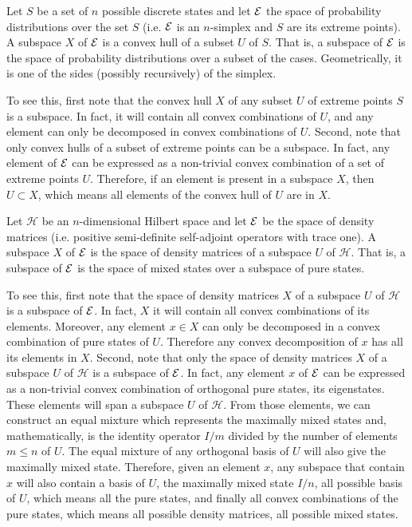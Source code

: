 \begin{example}
	Let $S$ be a set of $n$ possible discrete states and let $\mathcal{E}$ the space of probability distributions over the set $S$ (i.e. $\mathcal{E}$ is an $n$-simplex and $S$ are its extreme points). A subspace $X$ of $\mathcal{E}$ is a convex hull of a subset $U$ of $S$. That is, a subspace of $\mathcal{E}$ is the space of probability distributions over a subset of the cases. Geometrically, it is one of the sides (possibly recursively) of the simplex.
	
	To see this, first note that the convex hull $X$ of any subset $U$ of extreme points $S$ is a subspace. In fact, it will contain all convex combinations of $U$, and any element can only be decomposed in convex combinations of $U$. Second, note that only convex hulls of a subset of extreme points can be a subspace. In fact, any element of $\mathcal{E}$ can be expressed as a non-trivial convex combination of a set of extreme points $U$. Therefore, if an element is present in a subspace $X$, then $U \subset X$, which means all elements of the convex hull of $U$ are in $X$.
\end{example}

\begin{example}
	Let $\mathcal{H}$ be an $n$-dimensional Hilbert space and let $\mathcal{E}$ be the space of density matrices (i.e. positive semi-definite self-adjoint operators with trace one). A subspace $X$ of $\mathcal{E}$ is the space of density matrices of a subspace $U$ of $\mathcal{H}$. That is, a subspace of $\mathcal{E}$ is the space of mixed states over a subspace of pure states.
	
	To see this, first note that the space of density matrices $X$ of a subspace $U$ of $\mathcal{H}$ is a subspace of $\mathcal{E}$. In fact, $X$ it will contain all convex combinations of its elements. Moreover, any element $x \in X$ can only be decomposed in a convex combination of pure states of $U$. Therefore any convex decomposition of $x$ has all its elements in $X$. Second, note that only the space of density matrices $X$ of a subspace $U$ of $\mathcal{H}$ is a subspace of $\mathcal{E}$. In fact, any element $x$ of $\mathcal{E}$ can be expressed as a non-trivial convex combination of orthogonal pure states, its eigenstates. These elements will span a subspace $U$ of $\mathcal{H}$. From those elements, we can construct an equal mixture which represents the maximally mixed states and, mathematically, is the identity operator $I/m$ divided by the number of elements $m \leq n$ of $U$. The equal mixture of any orthogonal basis of $U$ will also give the maximally mixed state. Therefore, given an element $x$, any subspace that contain $x$ will also contain a basis of $U$, the maximally mixed state $I/n$, all possible basis of $U$, which means all the pure states, and finally all convex combinations of the pure states, which means all possible density matrices, all possible mixed states.
\end{example}

